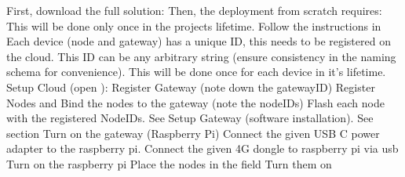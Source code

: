 First, download the full solution:\markdownRendererInterblockSeparator
{}\markdownRendererInterblockSeparator
{}Then, the deployment from scratch requires:\markdownRendererInterblockSeparator
{}\markdownRendererUlBeginTight
\markdownRendererUlItem {}\markdownRendererUlItemEnd 
\markdownRendererUlEndTight \markdownRendererInterblockSeparator
{}This will be done only once in the projects lifetime.\markdownRendererInterblockSeparator
{}Follow the instructions in \markdownRendererInterblockSeparator
{}\markdownRendererUlBegin
\markdownRendererUlItem {}\markdownRendererInterblockSeparator
{}Each device (node and gateway) has a unique ID, this needs to be registered on the cloud. This ID can be any arbitrary string (ensure consistency in the naming schema for convenience).\markdownRendererInterblockSeparator
{}This will be done once for each device in it's lifetime.\markdownRendererInterblockSeparator
{}\markdownRendererOlBeginTight
{}Setup Cloud (open ):\markdownRendererOlItemEnd 
\markdownRendererOlEndTight \markdownRendererInterblockSeparator
{}\markdownRendererUlBeginTight
\markdownRendererUlItem Register Gateway (note down the gatewayID)\markdownRendererUlItemEnd 
\markdownRendererUlItem Register Nodes and Bind the nodes to the gateway (note the nodeIDs)\markdownRendererUlItemEnd 
\markdownRendererUlEndTight \markdownRendererInterblockSeparator
{}\markdownRendererOlBegin
{}Flash each node with the registered NodeIDs. See \markdownRendererOlItemEnd 
{}Setup Gateway (software installation). See section \markdownRendererOlItemEnd 
\markdownRendererOlEnd \markdownRendererUlItemEnd 
\markdownRendererUlItem {}\markdownRendererUlItemEnd 
\markdownRendererUlEnd \markdownRendererInterblockSeparator
{}\markdownRendererOlBeginTight
{}Turn on the gateway (Raspberry Pi)\markdownRendererInterblockSeparator
{}\markdownRendererUlBeginTight
\markdownRendererUlItem Connect the given USB C power adapter to the raspberry pi.\markdownRendererUlItemEnd 
\markdownRendererUlItem Connect the given 4G dongle to raspberry pi via usb\markdownRendererUlItemEnd 
\markdownRendererUlItem Turn on the raspberry pi\markdownRendererUlItemEnd 
\markdownRendererUlEndTight \markdownRendererOlItemEnd 
{}Place the nodes in the field\markdownRendererOlItemEnd 
{}Turn them on\markdownRendererOlItemEnd 
\markdownRendererOlEndTight \relax